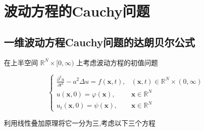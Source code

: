 \documentclass[../../PDE.tex]{subfiles}
\begin{document}
\ifSubfilesClassLoaded{
    \frontmatter

    \tableofcontents
    
    \mainmatter
}{}

\chapter{波动方程的Cauchy问题}

\section{一维波动方程Cauchy问题的达朗贝尔公式}

在上半空间 \(  \mathbb{R} ^{N}\times [0,\infty)  \) 上考虑波动方程的初值问题

\begin{equation}
    \begin{cases} \frac{\partial ^{2}u}{\partial t^{2}}-a^{2} \Delta u= f\left( \mathbf{x},t \right),&\left( \mathbf{x},t  \right)\in \mathbb{R} ^{N}\times \left( 0,\infty \right)    \\ 
        u\left( \mathbf{x},0 \right)=  \varphi \left( \mathbf{x} \right),&\mathbf{x}\in \mathbb{R} ^{N} \\ 
         u_{t}\left( \mathbf{x},0 \right)= \psi \left( \mathbf{x} \right),&\mathbf{x}\in \mathbb{R} ^{N}   \end{cases} 
\end{equation}

利用线性叠加原理将它一分为三,考虑以下三个方程
\end{document}
